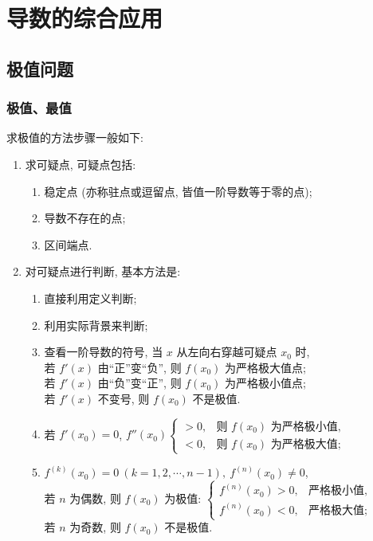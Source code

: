 \section{导数的综合应用}

\subsection{极值问题}

\subsubsection{极值、最值}

求极值的方法步骤一般如下:
\begin{enumerate}[label=(\arabic{*})]
    \item 求可疑点, 可疑点包括:
          \begin{enumerate}[label=(\roman{*})]
              \item 稳定点 (亦称驻点或逗留点, 皆值一阶导数等于零的点);
              \item 导数不存在的点;
              \item 区间端点.
          \end{enumerate}
    \item 对可疑点进行判断, 基本方法是:
          \begin{enumerate}[label=(\roman{*})]
              \item 直接利用定义判断;
              \item 利用实际背景来判断;
              \item 查看一阶导数的符号, 当 $x$ 从左向右穿越可疑点 $x_0$ 时, \\
                    若 $f'(x)$ 由“正”变“负”, 则 $f(x_0)$ 为严格极大值点;\\
                    若 $f'(x)$ 由“负”变“正”, 则 $f(x_0)$ 为严格极小值点;\\
                    若 $f'(x)$ 不变号, 则 $f(x_0)$ 不是极值.
              \item 若 $f'(x_0)=0$, $f''(x_0)\begin{cases}
                            >0 ,&\text{则 } f(x_0) \text{ 为严格极小值,} \\
                            <0 ,&\text{则 } f(x_0) \text{ 为严格极大值;}
                        \end{cases}$
              \item $f^{(k)}(x_0)=0~ (k=1,2,\cdots,n-1),~f^{(n)}(x_0)\neq 0$, \\
                    若 $n$ 为偶数, 则 $f(x_0)$ 为极值: $\begin{cases}
                            f^{(n)}(x_0)>0 ,&\text{严格极小值,} \\
                            f^{(n)}(x_0)<0 ,&\text{严格极大值;}
                        \end{cases}$\\
                    若 $n$ 为奇数, 则 $f(x_0)$ 不是极值.
          \end{enumerate}
\end{enumerate}


